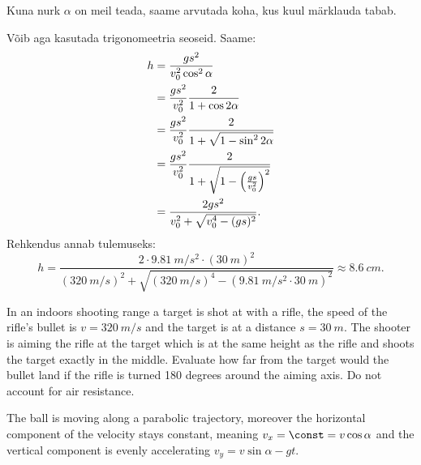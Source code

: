 {Kuna nurk $\alpha$ on meil teada, saame arvutada koha, kus kuul märklauda tabab.

Võib aga kasutada trigonomeetria seoseid. Saame:
\begin{align*}
h & = {gs^2 \over v_{0}^2\cos^2\alpha}\\
& = {gs^2 \over v_{0}^2}{2 \over 1+\cos2\alpha}\\
& = {gs^2 \over v_{0}^2}{2 \over 1+\sqrt{1-\sin^2 2\alpha}}\\
& = {gs^2 \over v_{0}^2}{2 \over 1+\sqrt{1-\Big({gs \over v_0^2}\Big)^2}}\\
& = {2gs^2 \over v_0^2+\sqrt{v_0^4-(gs)^2}}.
\end{align*}
Rehkendus annab tulemuseks:
$$
h  = \frac{2\cdot \SI{9,81}{m/s^2} \cdot (\SI{30}{m})^2}{(\SI{320}{m/s})^2+\sqrt{(\SI{320}{m/s})^4-(\SI{9,81}{m/s^2} \cdot \SI{30}{m})^2}} \approx \SI{8,6}{cm}.
$$
\fi


\ifEngStatement
In an indoors shooting range a target is shot at with a rifle, the speed of the rifle’s bullet is $v=\SI{320}{m/s}$ and the target is at a distance $s=\SI{30}{m}$. The shooter is aiming the rifle at the target which is at the same height as the rifle and shoots the target exactly in the middle. Evaluate how far from the target would the bullet land if the rifle is turned 180 degrees around the aiming axis. Do not account for air resistance.
\fi


\ifEngHint
The ball is moving along a parabolic trajectory, moreover the horizontal component of the velocity stays constant, meaning $v_x = \const = v\cos\alpha$ and the vertical component is evenly accelerating $v_y = v\sin\alpha - gt$.
\fi


}

